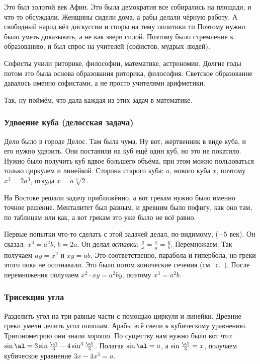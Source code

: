 \documentclass[a4paper,oneside,fleqn,10pt]{article}
\begin{document}
Это был золотой век Афин. Это была демократия все собирались на площади,
и что то обсуждали. Женщины сидели дома, а рабы делали чёрную работу.
А свободный народ вёл  дискуссии и споры на тему политики тп
Поэтому нужно было уметь доказывать, а не как звери силой.
Поэтому было стремление к образованию, и был спрос на учителей (софистов, мудрых людей).

Софисты учили риторике, философии, математике, астрономии. Долгие годы потом это была основа
образования риторика, философия. Светское образование давалось именно софистами,
а не просто учителями арифметики.

Так, ну поймём, что дала каждая из этих задач в математике.

\subsubsection{Удвоение куба (делосская задача)}

Дело было в городе Делос. Там была  чума. Ну вот, жертвенник в виде куба, и его нужно удвоить. Они поставили на куб
ещё один куб, но это не покатило. Нужно было получить куб вдвое большего объёма,
при этом можно пользоваться только циркулем и линейкой. Сторона старого куба: $a$,
нового куба $x$, поэтому $x^3  = 2a^3$, откуда $x = a\sqrt[3]{2}$.

На Востоке решали задачу приближённо, а вот грекам нужно было именно точное решение.
Менталитет был разным,  и древним было пофигу, как оно там, по таблицам или как,
а вот грекам это уже было не всё равно.

Первые попытки что-то сделать с этой задачей делал, по-видимому,
 ($-5$ век). Он сказал:
$x^3 = a^2b$, $b = 2a$. Он делал \emph{вставки}:
$\frac{a}{x} = \frac{x}{y} = \frac{y}{b}$. Перемножаем:
Так получаем $ay = x^2$ и $ xy = ab$. Это соответственно, парабола и гипербола,
но греки этого пока не осознавали. Это было потом конические сечения (см.~с.~\pageref{sec:conicae}).
После перемножения получаем $x^2 \cdot xy = a^2 by$, поэтому $x^3 = a^2b$.

\subsubsection{Трисекция угла}

Разделить угол на три равные части с помощью циркуля и линейки.
Древние греки умели делить угол пополам. Арабы всё свели к кубическому уравнению.
Тригонометрию они знали хорошо. По существу нам нужно было вот что:
$\sin \al = 3 \sin\frac\al3 - 4\sin^3\frac\al3$.
Полагая $\sin\al = a$, а $\sin\frac\al3 = x$, получаем кубическое уравнение
$3x-4x^3 = a$.
\end{document}
